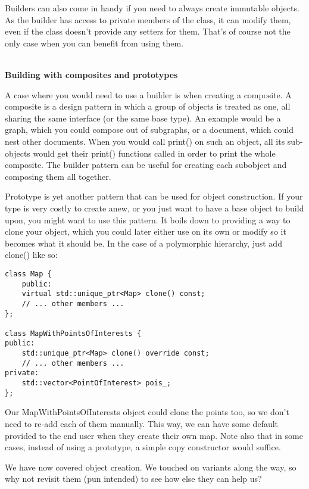 Builders can also come in handy if you need to always create immutable objects. As the builder has access to private members of the class, it can modify them, even if the class doesn't provide any setters for them. That's of course not the only case when you can benefit from using them.

\hspace*{\fill} \\ %
\noindent
\textbf{Building with composites and prototypes}

A case where you would need to use a builder is when creating a composite. A composite is a design pattern in which a group of objects is treated as one, all sharing the same interface (or the same base type). An example would be a graph, which you could compose out of subgraphs, or a document, which could nest other documents. When you would call print() on such an object, all its sub-objects would get their print() functions called in order to print the whole composite. The builder pattern can be useful for creating each subobject and composing them all together.

Prototype is yet another pattern that can be used for object construction. If your type is very costly to create anew, or you just want to have a base object to build upon, you might want to use this pattern. It boils down to providing a way to clone your object, which you could later either use on its own or modify so it becomes what it should be. In the case of a polymorphic hierarchy, just add clone() like so:

\begin{lstlisting}[style=styleCXX]
class Map {
	public:
	virtual std::unique_ptr<Map> clone() const;
	// ... other members ...
};

class MapWithPointsOfInterests {
public:
	std::unique_ptr<Map> clone() override const;
	// ... other members ...
private:
	std::vector<PointOfInterest> pois_;
};
\end{lstlisting}

Our MapWithPointsOfInterests object could clone the points too, so we don't need to re-add each of them manually. This way, we can have some default provided to the end user when they create their own map. Note also that in some cases, instead of using a prototype, a simple copy constructor would suffice.

We have now covered object creation. We touched on variants along the way, so why not revisit them (pun intended) to see how else they can help us?






















